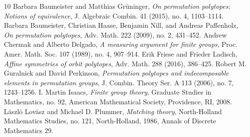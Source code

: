 \begin{thebibliography}{10}
 Barbara Baumeister and Matthias Gr\"{u}ninger, \emph{On permutation polytopes: Notions of equivalence}, J. Algebraic Combin. 41 (2015), no. 4, 1103--1114.
 Barbara Baumeister, Christian Haase, Benjamin Nill, and Andreas Paffenholz, \emph{On permutation polytopes}, Adv. Math. 222 (2009), no. 2, 431--452.
 Andrew Chermak and Alberto Delgado, \emph{A measuring argument for finite groups}, Proc. Amer. Math. Soc. 107 (1989), no. 4, 907--914.
 Erik Friese and Frieder Ladisch, \emph{Affine symmetries of orbit polytopes}, Adv. Math. 288 (2016), 386--425.
 Robert M. Guralnick and David Perkinson, \emph{Permutation polytopes and indecomposable elements in permutation groups}, J. Combin. Theory Ser. A 113 (2006), no. 7, 1243--1256.
 I. Martin Isaacs, \emph{Finite group theory}, Graduate Studies in Mathematics, no. 92, American Mathematical Society, Providence, RI, 2008.
 L\"{a}szl\"{o} Lov\"{a}sz and Michael D. Plummer, \emph{Matching theory}, North-Holland Mathematics Studies, no. 121, North-Holland, 1986, Annals of Discrete Mathematics 29.
\end{thebibliography}
